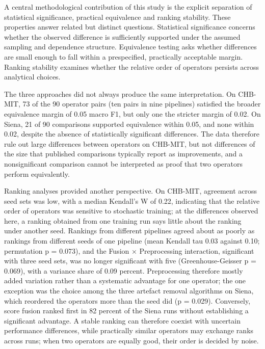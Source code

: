\documentclass[11pt,a4paper]{article}
\newcounter{none} %
\begin{document}
A central methodological contribution of this study is the explicit separation of
statistical significance, practical equivalence and ranking stability. These properties
answer related but distinct questions. Statistical significance concerns whether the
observed difference is sufficiently supported under the assumed sampling and dependence
structure. Equivalence testing asks whether differences are small enough to fall within a
prespecified, practically acceptable margin. Ranking stability examines whether the
relative order of operators persists across analytical choices.

The three approaches did not always produce the same interpretation. On CHB-MIT, 73 of
the 90 operator pairs (ten pairs in nine pipelines) satisfied the broader equivalence
margin of 0.05 macro F1, but only one the stricter margin of 0.02. On Siena, 21 of 90
comparisons supported equivalence within 0.05, and none within 0.02, despite the absence
of statistically significant differences. The data therefore rule out large differences
between operators on CHB-MIT, but not differences of the size that published comparisons
typically report as improvements, and a nonsignificant comparison cannot be interpreted
as proof that two operators perform equivalently.

Ranking analyses provided another perspective. On CHB-MIT, agreement across seed sets was
low, with a median Kendall's W of 0.22, indicating that the relative order of operators
was sensitive to stochastic training; at the differences observed here, a ranking obtained from one training run says little about the ranking under another seed. Rankings from different pipelines
agreed about as poorly as rankings from different seeds of one pipeline (mean Kendall
tau 0.03 against 0.10; permutation p = 0.073), and the Fusion × Preprocessing interaction, significant with three seed sets,
was no longer significant with five (Greenhouse-Geisser p = 0.069), with a variance
share of 0.09 percent. Preprocessing therefore mostly added variation rather than a
systematic advantage for one operator; the one exception was the choice among the three
artefact removal algorithms on Siena, which reordered the operators more than the seed
did (p = 0.029). Conversely, score fusion ranked first in 82 percent of the Siena runs
without establishing a significant advantage. A stable ranking can therefore coexist with
uncertain performance differences, while practically similar operators may exchange
ranks across runs; when two operators are equally good, their order is decided by noise.
\end{document}
